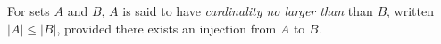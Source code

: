 \guard



\begin{defn}
\label{defn:smallerCardinality}
  For sets $A$ and $B$, $A$ is said to have \emph{cardinality no larger than} than $B$, written $\vert A\vert \leq \vert B\vert$, provided there exists an injection from $A$ to $B$.
\end{defn}
